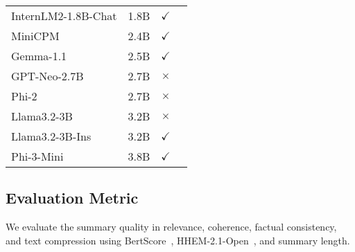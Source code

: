 \begin{table}[]
\begin{adjustbox}{max width=1\columnwidth}
\begin{tabular}{lccc}
InternLM2-1.8B-Chat & 1.8B    & $\checkmark$                                                  & \cite{cai2024internlm2}     \\
MiniCPM        & 2.4B         & $\checkmark$                                                  & \cite{hu2024minicpm}  \\
Gemma-1.1      & 2.5B         & $\checkmark$                                                  & \cite{team2024gemma}       \\
GPT-Neo-2.7B   & 2.7B         & $\times$                                                      & \cite{gpt-neo}       \\
Phi-2          & 2.7B         & $\times$                                                      & \cite{microsoft2023phi2}             \\
Llama3.2-3B    & 3.2B         & $\times$                                                      & \cite{llama3.2} \\
Llama3.2-3B-Ins& 3.2B         & $\checkmark$                                                  & \cite{llama3.2} \\
Phi-3-Mini     & 3.8B         & $\checkmark$                                                  & \cite{abdin2024phi3}   \\ \hline
\end{tabular}
\end{adjustbox}
\caption{ }
\label{tab:model_list}
\end{table}




\subsection{Evaluation Metric }

We evaluate the summary quality in relevance, coherence, factual consistency, and text compression using BertScore~\cite{bert-score}, HHEM-2.1-Open~\cite{HHEM-2.1-Open}, and summary length.



